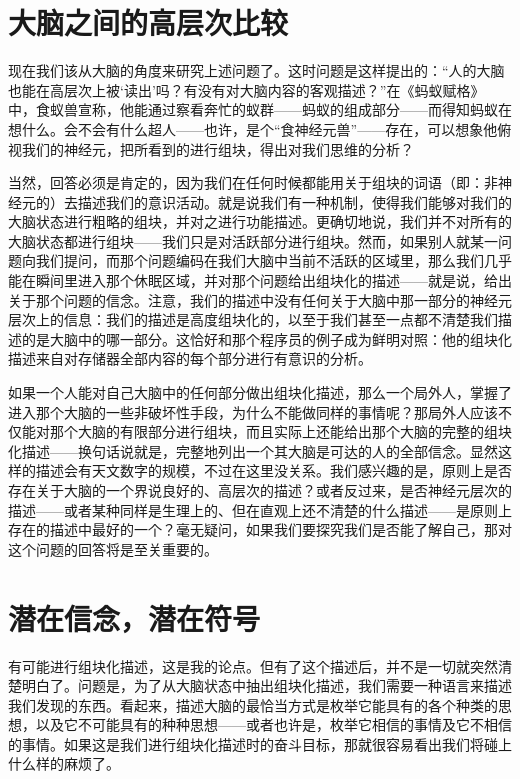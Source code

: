 \section{大脑之间的高层次比较}

现在我们该从大脑的角度来研究上述问题了。这时问题是这样提出的：“人的大脑也能在高层次上被‘读出’吗？有没有对大脑内容的客观描述？”在《蚂蚁赋格》中，食蚁兽宣称，他能通过察看奔忙的蚁群——蚂蚁的组成部分——而得知蚂蚁在想什么。会不会有什么超人——也许，是个“食神经元兽”——存在，可以想象他俯视我们的神经元，把所看到的进行组块，得出对我们思维的分析？

当然，回答必须是肯定的，因为我们在任何时候都能用关于组块的词语（即：非神经元的）去描述我们的意识活动。就是说我们有一种机制，使得我们能够对我们的大脑状态进行粗略的组块，并对之进行功能描述。更确切地说，我们并不对所有的大脑状态都进行组块——我们只是对活跃部分进行组块。然而，如果别人就某一问题向我们提问，而那个问题编码在我们大脑中当前不活跃的区域里，那么我们几乎能在瞬间里进入那个休眠区域，并对那个问题给出组块化的描述——就是说，给出关于那个问题的信念。注意，我们的描述中没有任何关于大脑中那一部分的神经元层次上的信息：我们的描述是高度组块化的，以至于我们甚至一点都不清楚我们描述的是大脑中的哪一部分。这恰好和那个程序员的例子成为鲜明对照：他的组块化描述来自对存储器全部内容的每个部分进行有意识的分析。

如果一个人能对自己大脑中的任何部分做出组块化描述，那么一个局外人，掌握了进入那个大脑的一些非破坏性手段，为什么不能做同样的事情呢？那局外人应该不仅能对那个大脑的有限部分进行组块，而且实际上还能给出那个大脑的完整的组块化描述——换句话说就是，完整地列出一个其大脑是可达的人的全部信念。显然这样的描述会有天文数字的规模，不过在这里没关系。我们感兴趣的是，原则上是否存在关于大脑的一个界说良好的、高层次的描述？或者反过来，是否神经元层次的描述——或者某种同样是生理上的、但在直观上还不清楚的什么描述——是原则上存在的描述中最好的一个？毫无疑问，如果我们要探究我们是否能了解自己，那对这个问题的回答将是至关重要的。

\section{潜在信念，潜在符号}

有可能进行组块化描述，这是我的论点。但有了这个描述后，并不是一切就突然清楚明白了。问题是，为了从大脑状态中抽出组块化描述，我们需要一种语言来描述我们发现的东西。看起来，描述大脑的最恰当方式是枚举它能具有的各个种类的思想，以及它不可能具有的种种思想——或者也许是，枚举它相信的事情及它不相信的事情。如果这是我们进行组块化描述时的奋斗目标，那就很容易看出我们将碰上什么样的麻烦了。

